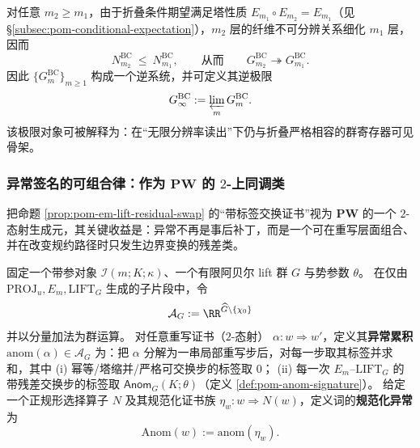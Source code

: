 

\begin{corollary}[分辨率塔上的可见寄存器逆系统]\label{cor:pom-bc-inverse-system}
对任意 \(m_2\ge m_1\)，由于折叠条件期望满足塔性质 \(E_{m_1}\circ E_{m_2}=E_{m_1}\)（见 \S\ref{subsec:pom-conditional-expectation}），\(m_2\) 层的纤维不可分辨关系细化 \(m_1\) 层，因而
\[
N^{\mathrm{BC}}_{m_2}\ \le\ N^{\mathrm{BC}}_{m_1},
\qquad\text{从而}\qquad
G^{\mathrm{BC}}_{m_2}\twoheadrightarrow G^{\mathrm{BC}}_{m_1}.
\]
因此 \(\{G^{\mathrm{BC}}_m\}_{m\ge 1}\) 构成一个逆系统，并可定义其逆极限
\[
G^{\mathrm{BC}}_\infty:=\varprojlim_m G^{\mathrm{BC}}_m.
\]
该极限对象可被解释为：在“无限分辨率读出”下仍与折叠严格相容的群寄存器可见骨架。
\end{corollary}

\subsubsection{异常签名的可组合律：作为 \texorpdfstring{$\mathbf{PW}$}{PW} 的 \texorpdfstring{$2$}{2}-上同调类}\label{subsec:pom-anom-cohomology}
把命题 \ref{prop:pom-em-lift-residual-swap} 的“带标签交换证书”视为 \(\mathbf{PW}\) 的一个 \(2\)-态射生成元，其关键收益是：异常不再是事后补丁，而是一个可在重写层面组合、并在改变规约路径时只发生边界变换的残差类。

\begin{definition}[异常累积与规范化异常]\label{def:pom-anom-accumulation}
固定一个带参对象 \(\mathcal{I}(m;K;\kappa)\)、一个有限阿贝尔 lift 群 \(G\) 与势参数 \(\theta\)。
在仅由 \(\mathrm{PROJ}_u,E_m,\mathrm{LIFT}_G\) 生成的子片段中，令
\[
\mathcal{A}_G:=\RR^{\widehat G\setminus\{\chi_0\}}
\]
并以分量加法为群运算。
对任意重写证书（\(2\)-态射） \(\alpha:w\Rightarrow w'\)，定义其\textbf{异常累积}
\(\mathrm{anom}(\alpha)\in\mathcal{A}_G\)
为：把 \(\alpha\) 分解为一串局部重写步后，对每一步取其标签并求和，其中
(i) 幂等/塔缩并/严格可交换步的标签取 \(0\)；
(ii) 每一次 \(E_m\)--\(\mathrm{LIFT}_G\) 的带残差交换步的标签取 \(\mathsf{Anom}_G(K;\theta)\)（定义 \ref{def:pom-anom-signature}）。
给定一个正规形选择算子 \(N\) 及其规范化证书族 \(\eta_w:w\Rightarrow N(w)\)，定义词的\textbf{规范化异常}为
\[
\mathrm{Anom}(w):=\mathrm{anom}(\eta_w).
\]
\end{definition}

